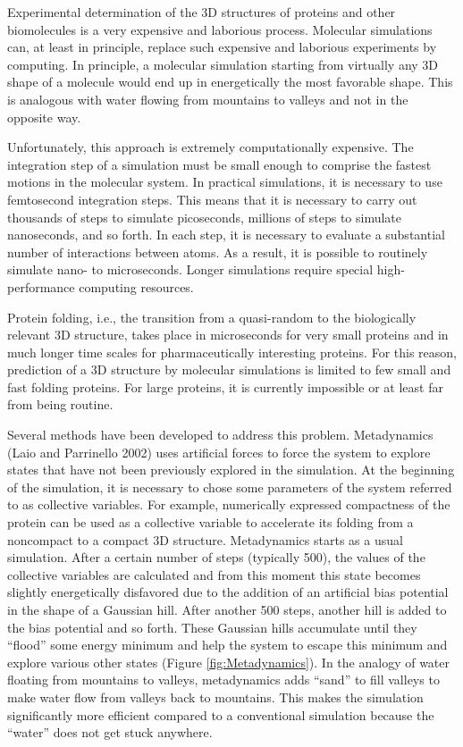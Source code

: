Experimental determination of the 3D structures of proteins and other biomolecules
is a very expensive and laborious process. Molecular simulations can, at least
in principle, replace such expensive and laborious experiments by computing.
In principle, a molecular simulation starting from virtually any 3D shape of
a molecule would end up in energetically the most favorable shape. This is analogous
with water flowing from mountains to valleys and not in the opposite way.

Unfortunately, this approach is extremely computationally expensive.
The integration step of a simulation must be small enough to
comprise the fastest motions in the molecular system. In practical simulations, it is necessary
to use femtosecond integration steps. This means that it is necessary to carry out
thousands of steps to simulate picoseconds, millions of steps to simulate nanoseconds, and so
forth. In each step, it is necessary to evaluate a substantial number of interactions between atoms.
As a result, it is possible to routinely simulate nano- to microseconds.
Longer simulations require special high-performance computing resources.

Protein folding, i.e., the transition from a quasi-random to the biologically relevant
3D structure, takes place in microseconds for very small proteins and in much longer
time scales for pharmaceutically interesting proteins. For this reason, prediction
of a 3D structure by molecular simulations is limited to few small and fast folding
proteins. For large proteins, it is currently impossible or at least far from being routine.

Several methods have been developed to address this problem. Metadynamics (Laio and Parrinello 2002)
uses artificial forces to force the system to explore states that have not been previously
explored in the simulation. At the beginning of the simulation, it is necessary to
chose some parameters of the system referred to as collective variables. For example,
numerically expressed compactness of the protein can be used as a collective variable
to accelerate its folding from a noncompact to a compact 3D structure.
Metadynamics starts as a usual simulation. After a certain number of steps
(typically 500), the values of the collective variables are calculated and from this moment
this state becomes slightly energetically disfavored due to the addition of
an artificial bias potential in the shape of a Gaussian hill.
After another 500 steps, another
hill is added to the bias potential and so forth. These Gaussian hills accumulate until
they ``flood'' some energy minimum and help the system to escape this minimum
and explore various other states
(Figure \ref{fig:Metadynamics}). In the analogy of water floating from mountains
to valleys, metadynamics adds ``sand'' to fill valleys to make water flow from
valleys back to mountains. This makes the simulation significantly more efficient
compared to a conventional simulation because the ``water'' does not get stuck anywhere.

